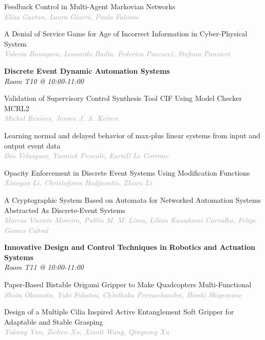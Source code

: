 \begin{multicols*}{2}
\small Feedback Control in Multi-Agent Markovian Networks\\ 
\footnotesize \textcolor{darkgray}{\textit{Elisa Gaetan, Laura  Giarrè, Paolo  Falcone}}

\small A Denial of Service Game for Age of Incorrect Information in Cyber-Physical System\\ 
\footnotesize \textcolor{darkgray}{\textit{Valeria Bonagura, Leonardo  Badia, Federica  Pascucci, Stefano  Panzieri}}

\normalsize \textbf{Discrete Event Dynamic Automation Systems}\\
\small \textit{Room T10 @ 10:00-11:00}

\small Validation of Supervisory Control Synthesis Tool CIF Using Model Checker MCRL2\\ 
\footnotesize \textcolor{darkgray}{\textit{Michel Reniers, Jeroen J. A.  Keiren}}

\small Learning normal and delayed behavior of max-plus linear systems from input and output event data\\ 
\footnotesize \textcolor{darkgray}{\textit{Ibis Velasquez, Yannick  Pencolé, Euriell  Le Corronc}}

\small Opacity Enforcement in Discrete Event Systems Using Modification Functions\\ 
\footnotesize \textcolor{darkgray}{\textit{Xiaoyan Li, Christoforos  Hadjicostis, Zhiwu  Li}}

\small A Cryptographic System Based on Automata for Networked Automation Systems Abstracted As Discrete-Event Systems\\ 
\footnotesize \textcolor{darkgray}{\textit{Marcos Vicente Moreira, Publio M. M.  Lima, Lilian Kawakami  Carvalho, Felipe Gomes  Cabral}}

\normalsize \textbf{Innovative Design and Control Techniques in Robotics and Actuation Systems}\\
\small \textit{Room T11 @ 10:00-11:00}

\small Paper-Based Bistable Origami Gripper to Make Quadcopters Multi-Functional\\ 
\footnotesize \textcolor{darkgray}{\textit{Shuta Okamoto, Yuki  Fukatsu, Chinthaka  Premachandra, Hiroki  Shigemune}}

\small Design of a Multiple Cilia Inspired Active Entanglement Soft Gripper for Adaptable and Stable Grasping\\ 
\footnotesize \textcolor{darkgray}{\textit{Yukang Yan, Zichen  Xu, Xianli  Wang, Qingsong  Xu}}


\end{multicols*}
